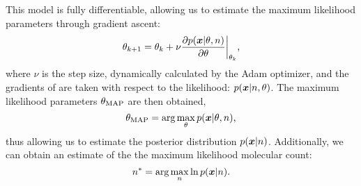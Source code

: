   This model is fully differentiable, allowing us to estimate 
  the maximum likelihood parameters through gradient ascent:
  \begin{align}
    \theta_{k+1} = \theta_{k} + \nu \frac{\partial p(\bm{x} | \theta, n)}{\partial \theta}
    \bigg\rvert_{\theta_{k}}
    \notag
    \text{,}
  \end{align}
  where $\nu$ is the step size, dynamically calculated by the Adam optimizer, and 
  the gradients of \parameters are taken with respect to the likelihood: $p(\bm{x} | n, \theta)$.
  The maximum likelihood parameters $\theta_\text{MAP}$ are then obtained,
  \begin{equation}
    \theta_\text{MAP} = \text{arg}\max_{\theta} p(\bm{x} | \theta, n)
    \text{,}
  \end{equation}
  thus allowing us to estimate the posterior distribution $p(\bm{x}|n)$. 
  Additionally, we can obtain an estimate of the the maximum likelihood molecular count:
  \begin{equation}
      n^* =
      \text{arg}\max_{n}
        \ln p(\bm{x} | n)
    \text{.}
    \label{eq:method:optimization}
  \end{equation}
